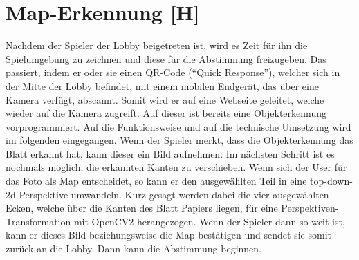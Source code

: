 
\section{Map-Erkennung [H]}\label{maai:maperkennung:head}
Nachdem der Spieler der Lobby beigetreten ist, wird es Zeit für ihn die Spielumgebung zu zeichnen und diese für die
Abstimmung freizugeben. Das passiert, indem er oder sie einen QR-Code (``Quick Response''), welcher sich in der
Mitte der Lobby befindet, mit einem mobilen Endgerät, das über eine Kamera verfügt, abscannt. Somit wird
er auf eine Webseite geleitet, welche wieder auf die Kamera zugreift. Auf dieser ist bereits eine Objekterkennung
vorprogrammiert. Auf die Funktionsweise und auf die technische Umsetzung wird im folgenden eingegangen. Wenn der Spieler
merkt, dass die Objekterkennung das Blatt erkannt hat, kann dieser ein Bild aufnehmen. Im nächsten Schritt ist es nochmals möglich,
die erkannten Kanten zu verschieben. Wenn sich der User für das Foto als Map entscheidet, so kann er den ausgewählten Teil in eine
top-down-2d-Perspektive
umwandeln. Kurz gesagt werden dabei die vier ausgewählten Ecken, welche über die Kanten des Blatt Papiers liegen,
für eine Perspektiven-Transformation
mit OpenCV2 herangezogen. Wenn der Spieler dann so weit ist, kann er dieses Bild beziehungsweise die Map bestätigen und
sendet sie somit zurück an die Lobby. Dann kann die Abstimmung beginnen.

